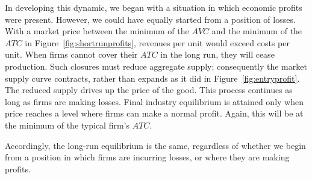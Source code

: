 In developing this dynamic, we began with a situation in which economic profits were present. However, we could have equally started from a position of losses. With a market price between the minimum of the $AVC$ and the minimum of the $ATC$ in Figure~\ref{fig:shortrunprofits}, revenues per unit would exceed costs per unit. When firms cannot cover their $ATC$ in the long run, they will cease production. Such closures must reduce aggregate supply; consequently the market supply curve contracts, rather than expands as it did in Figure~\ref{fig:entryprofit}. The reduced supply drives up the price of the good. This process continues as long as firms are making losses. Final industry equilibrium is attained only when price reaches a level where firms can make a normal profit. Again, this will be at the minimum of the typical firm's $ATC$.

Accordingly, the long-run equilibrium is the same, regardless of whether we begin from a position in which firms are incurring losses, or where they are making profits.